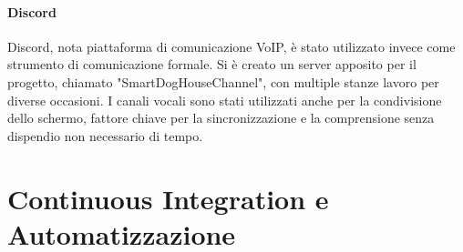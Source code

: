     \paragraph{Discord}
    Discord, nota piattaforma di comunicazione VoIP, è stato utilizzato invece come strumento di comunicazione formale. Si è creato un server apposito per il progetto, chiamato "SmartDogHouseChannel", con multiple stanze lavoro per diverse occasioni.
    I canali vocali sono stati utilizzati anche per la condivisione dello schermo, fattore chiave per la sincronizzazione e la comprensione senza dispendio non necessario di tempo. 

\section{Continuous Integration e Automatizzazione}
\label{chap:CI}
